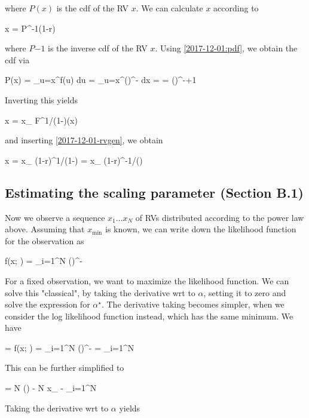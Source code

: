 where $P(x)$ is the cdf of the RV $x$. We can calculate $x$ according to

\be\label{2017-12-01-rvgen}
x = P^{-1}(1-r)
\ee

where $P{-1}$ is the inverse cdf of the RV $x$. Using \eqref{2017-12-01:pdf}, we obtain the cdf via

\bee
P(x) = \int_{u=x}^\infty f(u) du =  \int_{u=x}^\infty \left(\right)^{-\alpha} dx = \cdots = \left(\right)^{-\alpha+1}
\eee

Inverting this yields

\bee
x = x_{} F^{1/(1-\alpha)}(x)
\eee

and inserting \eqref{2017-12-01-rvgen}, we obtain

\bee
x = x_{} (1-r)^{1/(1-\alpha)} = x_{} (1-r)^{-1/()}
\eee

\subsection{Estimating the scaling parameter (Section B.1)}

Now we observe a sequence $x_1 \ldots x_N$ of RVs distributed according to the power law above. Assuming that $x_{\text{min}}$ is known, we can write down the likelihood function for the observation as

\bee
f(x; \alpha) = \prod_{i=1}^N  \left(\right)^{-\alpha}
\eee

For a fixed observation, we want to maximize the likelihood function. We can solve this "classical", by taking the derivative wrt to $\alpha$, setting it to zero and solve the expression for $\alpha^\star$. The derivative taking becomes simpler, when we consider the log likelihood function instead, which has the same minimum. We have

\bee
{} = \ln f(x; \alpha) = 
\ln \prod_{i=1}^N  \left(\right)^{-\alpha} = 
\sum_{i=1}^N 
\eee

This can be further simplified to

\bee
{} = N \ln () - N \ln x_{} - \alpha \sum_{i=1}^N \ln {}
\eee

Taking the derivative wrt to $\alpha$ yields

